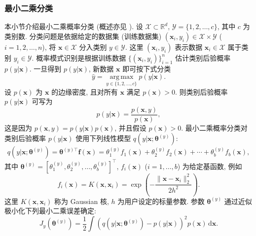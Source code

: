 \subsubsection{{最小二乘分类}}\label{subsec:least-squares-classification}
{本小节介绍最小二乘概率分类  (概述亦见 ).}
{设 $\mathcal{X}\subset\mathbb{R}^d$, $\mathcal{Y}=\{1,2,\ldots,c\}$, 其中 $c$ 为类别数. 分类问题是依据给定的数据集 (训练数据集) $(\boldsymbol{x}_i,y_i)\in\mathcal{X}\times\mathcal{Y}$ ($i=1,2,\ldots,n$), 将 $\boldsymbol{x}\in\mathcal{X}$ 分入类别 $y\in\mathcal{Y}$. 这里 $(\boldsymbol{x}_i,y_i)$ 表示数据 $\boldsymbol{x}_i\in\mathcal{X}$ 属于类别 $y_i\in\mathcal{Y}$.}
{概率模式识别是根据训练数据 $\{(\boldsymbol{x}_i,y_i)\}_{i=1}^n$ 估计类别后验概率 $p(y|\boldsymbol{x})$. 一旦得到 $p(y|\boldsymbol{x})$, 新数据 $\boldsymbol{x}$ 即可按下式分类}
\[\widehat y=\operatorname*{arg\,max}_{y\in\{1,2,\ldots,c\}}p(y|\boldsymbol{x}).\]
{设 $p(\boldsymbol{x})$ 为 $\boldsymbol{x}$ 的边缘密度, 且对所有 $\boldsymbol{x}$ 满足 $p(\boldsymbol{x})>0$. 则类别后验概率 $p(y|\boldsymbol{x})$ 可写为}
\begin{equation}\label{eq:class-posterior-probability}
p(y|\boldsymbol{x})=\frac{p(\boldsymbol{x},y)}{p(\boldsymbol{x})},
\end{equation}
{这是因为 $p(\boldsymbol{x},y)=p(y|\boldsymbol{x})p(\boldsymbol{x})$, 并且假设 $p(\boldsymbol{x})>0$. 最小二乘概率分类对类别后验概率 $p(y|\boldsymbol{x})$ 使用下列线性模型 $q(y|\boldsymbol{x};\boldsymbol{\theta}^{(y)})$:}
\begin{equation}\label{eq:classification-basis-model}\label{srcpage:printed-61}
q(y|\boldsymbol{x};\boldsymbol{\theta}^{(y)})=\boldsymbol{\theta}^{(y)\top}\boldsymbol{f}(\boldsymbol{x})=\theta_1^{(y)}f_1(\boldsymbol{x})+\theta_2^{(y)}f_2(\boldsymbol{x})+\cdots+\theta_b^{(y)}f_b(\boldsymbol{x}),
\end{equation}
{其中 $\boldsymbol{\theta}^{(y)}=[\theta_1^{(y)},\theta_2^{(y)},\ldots,\theta_b^{(y)}]^{\top}$, $f_i(\boldsymbol{x})$ ($i=1,\ldots,b$) 为给定基函数, 例如}
\begin{equation}\label{eq:classification-gaussian-kernel}
f_i(\boldsymbol{x})=K(\boldsymbol{x},\boldsymbol{x}_i)=\exp\left(-\frac{\|\boldsymbol{x}-\boldsymbol{x}_i\|_2^2}{2h^2}\right).
\end{equation}
{这里 $K(\boldsymbol{x},\boldsymbol{x}_i)$ 称为 Gaussian 核, $h$ 为用户设定的标量参数. 参数 $\boldsymbol{\theta}^{(y)}$ 通过近似极小化下列最小二乘误差确定:}
\[J_y(\boldsymbol{\theta}^{(y)})=\frac12\int\left(q(y|\boldsymbol{x};\boldsymbol{\theta}^{(y)})-p(y|\boldsymbol{x})\right)^2p(\boldsymbol{x})\,\mathrm d\boldsymbol{x}.\]
